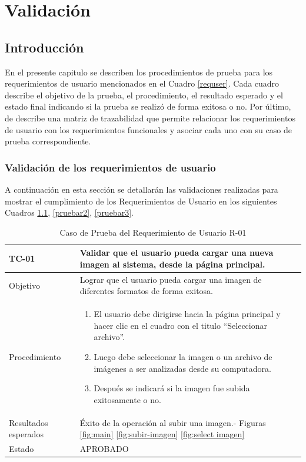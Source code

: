 \chapter{Validación}
\label{Validacion}

\section{Introducción}
En el presente capitulo se describen los procedimientos de prueba para los requerimientos de usuario mencionados en el Cuadro \ref{requser}. Cada cuadro describe el objetivo de la prueba, el procedimiento, el resultado esperado y el estado final indicando si la prueba se realizó de forma exitosa o no. Por último, de describe una matriz de trazabilidad que permite relacionar los requerimientos de usuario con los requerimientos funcionales y asociar cada uno con su caso de prueba correspondiente.


\subsection{Validación de los requerimientos de usuario}

A continuación en esta sección se detallarán las validaciones realizadas para mostrar el cumplimiento de los Requerimientos de Usuario en los siguientes Cuadros \ref{pruebar1}, \ref{pruebar2}, \ref{pruebar3}.

\begin{table}[h!]
    \begin{tabular}{ | p{3cm} |p{9cm}| }
        \hline
        \rowcolor[HTML]{d6d8ff}
        TC-01 & Validar que el usuario pueda cargar una nueva imagen al sistema, desde la página principal.\\
        \hline
        Objetivo & Lograr que el usuario pueda cargar una imagen de diferentes formatos de forma exitosa.\\
        \hline
        Procedimiento & \begin{enumerate}
            \item El usuario debe dirigirse hacia la página principal y hacer clic en el
        cuadro con el titulo “Seleccionar archivo”.
            \item Luego debe seleccionar la imagen o un archivo de imágenes a ser analizadas desde su computadora.
            \item Después se indicará si la imagen fue subida exitosamente o no.
        \end{enumerate}\\
        \hline
        Resultados esperados & Éxito de la operación al subir una imagen.- Figuras \ref{fig:main} \ref{fig:subir-imagen} \ref{fig:select imagen}\\
        \hline
        Estado & APROBADO \\
        \hline
    \end{tabular}\\
    \caption{Caso de Prueba del Requerimiento de Usuario R-01}
    \label{pruebar1}
\end{table}


